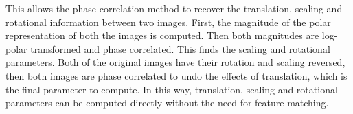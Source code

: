 This allows the phase correlation method to recover the translation, scaling and rotational information between two images. First, the magnitude of the polar representation of both the images is computed. Then both magnitudes are log-polar transformed and phase correlated. This finds the scaling and rotational parameters. Both of the original images have their rotation and scaling reversed, then both images are phase correlated to undo the effects of translation, which is the final parameter to compute. In this way, translation, scaling and rotational parameters can be computed directly without the need for feature matching. \\
